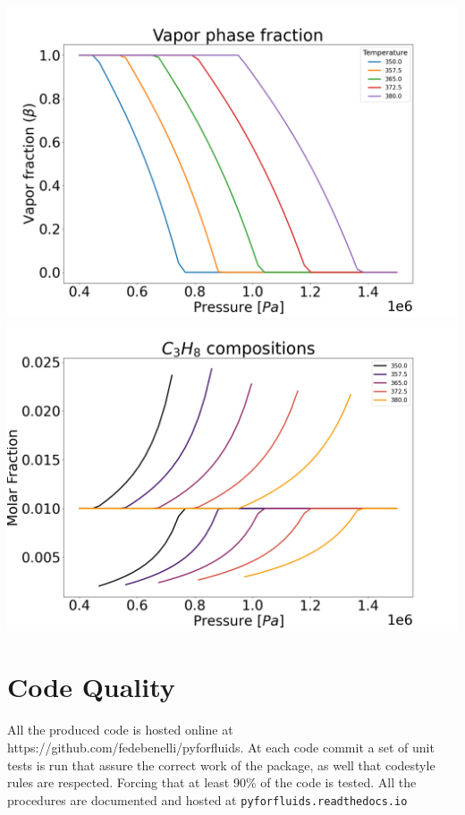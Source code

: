 \documentclass[a0,portrait]{a0poster}
\begin{document}
\begin{multicols}{2}
\begin{multicols}{2}
\includegraphics[width=17cm]{beta.png}
\includegraphics[width=17cm]{flashes.png}

\end{multicols}

\section*{Code Quality}
All the produced code is hosted online at
https://github.com/fedebenelli/pyforfluids. At each code commit a set of unit
tests is run that assure the correct work of the package, as well that
codestyle rules are respected. Forcing that at least 90\% of the code is
tested. All the procedures are documented and hosted at
\texttt{pyforfluids.readthedocs.io}

\nocite{*} %
%

\printbibliography

\end{multicols}
\end{document}
